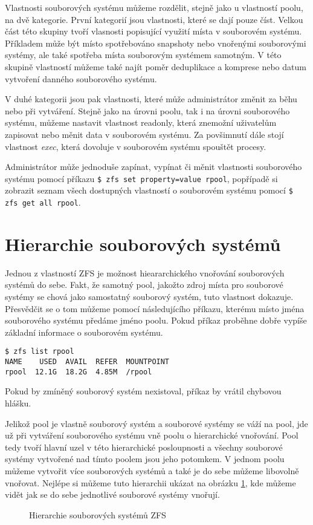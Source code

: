 Vlastnosti souborových systému můžeme rozdělit, stejně jako u vlastností poolu, na dvě kategorie. První kategorií jsou vlastnosti, které se dají pouze číst. Velkou část této skupiny tvoří vlasnosti popisující využití místa v souborovém systému. Příkladem může být místo spotřebováno snapshoty nebo vnořenými souborovými systémy, ale také spotřeba místa souborovým systémem samotným. V této skupině vlastností můžeme také najít poměr deduplikace a komprese nebo datum vytvoření danného souborového systému.

V duhé kategorii jsou pak vlastnosti, které může administrátor změnit za běhu nebo při vytváření. Stejně jako na úrovni poolu, tak i na úrovni souborového systému, můžeme nastavit vlastnost readonly, která znemožní uživatelům zapisovat nebo měnit data v souborovém systému. Za povšimnutí dále stojí vlastnost \emph{exec}, která dovoluje v souborovém systému spouštět procesy.

Administrátor může jednoduše zapínat, vypínat či měnit vlastnosti souborového systému pomocí příkazu \verb|$ zfs set property=value rpool|, popřípadě si zobrazit seznam všech dostupných vlastností o souborovém systému pomocí \verb|$ zfs get all rpool|.

\section{Hierarchie souborových systémů}
\label{hiararchy}
Jednou z vlastností ZFS je možnost hieararchického vnořování souborových systémů do sebe. Fakt, že samotný pool, jakožto zdroj místa pro souborové systémy se chová jako samostatný souborový systém, tuto vlastnost dokazuje. Přesvědčit se o tom můžeme pomocí následujícího příkazu, kterému místo jména souborového systému předáme jméno poolu. Pokud příkaz proběhne dobře vypíše základní informace o souborovém systému.
\begin{verbatim}
$ zfs list rpool
NAME    USED  AVAIL  REFER  MOUNTPOINT
rpool  12.1G  18.2G  4.85M  /rpool
\end{verbatim}
Pokud by zmíněný souborový systém nexistoval, příkaz by vrátil chybovou hlášku.

Jelikož pool je vlastně souborový systém a souborové systémy se váží na pool, jde už při vytváření souborového systému vně poolu o hierarchické vnořování. Pool tedy tvoří hlavní uzel v této hierarchické posloupnosti a všechny souborové systémy vytvořené nad tímto poolem jsou jeho potomkem. V jednom poolu můžeme vytvořit více souborových systémů a také je do sebe můžeme libovolně vnořovat. Nejlépe si můžeme tuto hierarchii ukázat na obrázku \ref{fshierarchy}, kde můžeme vidět jak se do sebe jednotlivé souborové systémy vnořují.
\begin{figure}[h]
    \caption{Hierarchie souborových systémů ZFS}
    \label{fshierarchy}
\end{figure}

